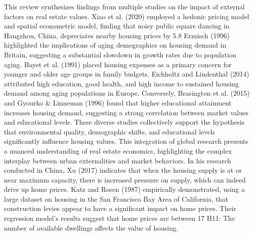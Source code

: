 \documentclass{aip-cp}
\begin{document}
This review synthesizes findings from multiple studies on the impact of external factors on real estate values. Xiao et al. (2020) employed a hedonic pricing model and spatial econometric model, finding that noisy public square dancing in Hangzhou, China, depreciates nearby housing prices by 5.8%
Ermisch (1996) highlighted the implications of aging demographics on housing demand in Britain, suggesting a substantial slowdown in growth rates due to population aging. Bayet et al. (1991) placed housing expenses as a primary concern for younger and older age groups in family budgets. Eichholtz and Lindenthal (2014) attributed high education, good health, and high income to sustained housing demand among aging populations in Europe. Conversely, Brasington et al. (2015) and Gyourko & Linneman (1996) found that higher educational attainment increases housing demand, suggesting a strong correlation between market values and educational levels.
These diverse studies collectively support the hypothesis that environmental quality, demographic shifts, and educational levels significantly influence housing values. This integration of global research presents a nuanced understanding of real estate economics, highlighting the complex interplay between urban externalities and market behaviors.
In his research conducted in China, Xu (2017) indicates that when the housing supply is at or near maximum capacity, there is increased pressure on supply, which can indeed drive up home prices. Katz and Rosen (1987) empirically demonstrated, using a large dataset on housing in the San Francisco Bay Area of California, that construction levies appear to have a significant impact on home prices. Their regression model's results suggest that home prices are between 17%
H11: The number of available dwellings affects the value of housing.
\end{document}
